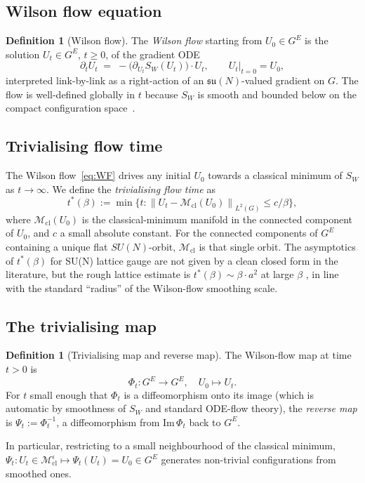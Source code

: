 \documentclass[11pt,a4paper]{amsart}
\theoremstyle{definition}
\newtheorem{definition}[theorem]{Definition}
\newcommand{\su}{\mathfrak{su}}
\newcommand{\norm}[1]{\left\lVert#1\right\rVert}
\begin{document}
\subsection{Wilson flow equation}
\begin{definition}[Wilson flow]\label{def:WF}
The \emph{Wilson flow} starting from $U_0 \in G^E$ is the solution
$U_t \in G^E$, $t\geq 0$, of the gradient ODE
\begin{equation}\label{eq:WF}
\partial_t U_t \;=\; -\bigl(\partial_{U_t} S_W(U_t)\bigr)\cdot U_t,
\qquad
U_t|_{t=0} = U_0,
\end{equation}
interpreted link-by-link as a right-action of an $\su(N)$-valued
gradient on $G$. The flow is well-defined globally in $t$ because
$S_W$ is smooth and bounded below on the compact configuration
space~\cite[Prop.~3.1]{Luscher2010WilsonFlow}.
\end{definition}

\subsection{Trivialising flow time}
The Wilson flow~\eqref{eq:WF} drives any initial $U_0$ towards a
classical minimum of $S_W$ as $t\to\infty$. We define the
\emph{trivialising flow time} as
\begin{equation}\label{eq:t-star}
t^*(\beta) := \min\bigl\{t : \norm{U_t -
\mathcal M_\mathrm{cl}(U_0)}_{L^2(G)} \leq c/\beta\bigr\},
\end{equation}
where $\mathcal M_\mathrm{cl}(U_0)$ is the classical-minimum manifold
in the connected component of $U_0$, and $c$ a small absolute constant.
For the connected components of $G^E$ containing a unique flat
$SU(N)$-orbit, $\mathcal M_\mathrm{cl}$ is that single orbit. The
asymptotics of $t^*(\beta)$ for SU(N) lattice gauge are not given by a
clean closed form in the literature, but the rough lattice estimate is
$t^*(\beta) \sim \beta\cdot a^2$ at large $\beta$
\cite[\S 4]{Luscher2010WilsonFlow}, in line with the standard
``radius'' of the Wilson-flow smoothing scale.

\subsection{The trivialising map}
\begin{definition}[Trivialising map and reverse map]\label{def:Phi-Psi}
The Wilson-flow map at time $t > 0$ is
$$
\Phi_t : G^E \to G^E, \quad U_0 \mapsto U_t.
$$
For $t$ small enough that $\Phi_t$ is a diffeomorphism onto its image
(which is automatic by smoothness of $S_W$ and standard ODE-flow
theory), the \emph{reverse map} is
$\Psi_t := \Phi_t^{-1}$, a diffeomorphism from $\mathrm{Im}\,\Phi_t$
back to $G^E$.

In particular, restricting to a small neighbourhood of the
classical minimum, $\Psi_t : U_t \in \mathcal M_\mathrm{cl}^\epsilon \mapsto
\Psi_t(U_t) = U_0 \in G^E$ generates non-trivial configurations from
smoothed ones.
\end{definition}
\end{document}
